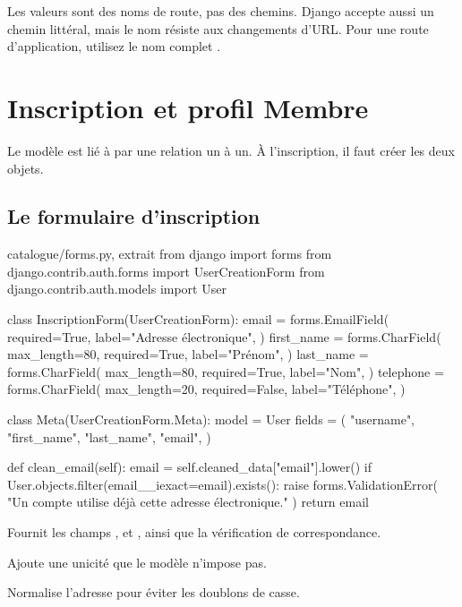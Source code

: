 \begin{note}
Les valeurs sont des noms de route, pas des chemins. Django accepte aussi un chemin
littéral, mais le nom résiste aux changements d'URL. Pour une route d'application,
utilisez le nom complet .
\end{note}

\section{Inscription et profil Membre}

Le modèle  est lié à  par une relation un à un. À
l'inscription, il faut créer les deux objets.

\subsection{Le formulaire d'inscription}

\begin{codebox}[python]{catalogue/forms.py, extrait}
from django import forms
from django.contrib.auth.forms import UserCreationForm
from django.contrib.auth.models import User


class InscriptionForm(UserCreationForm):
    email = forms.EmailField(
        required=True,
        label="Adresse électronique",
    )
    first_name = forms.CharField(
        max_length=80,
        required=True,
        label="Prénom",
    )
    last_name = forms.CharField(
        max_length=80,
        required=True,
        label="Nom",
    )
    telephone = forms.CharField(
        max_length=20,
        required=False,
        label="Téléphone",
    )

    class Meta(UserCreationForm.Meta):
        model = User
        fields = (
            "username",
            "first_name",
            "last_name",
            "email",
        )

    def clean_email(self):
        email = self.cleaned_data["email"].lower()
        if User.objects.filter(email__iexact=email).exists():
            raise forms.ValidationError(
                "Un compte utilise déjà cette adresse électronique."
            )
        return email
\end{codebox}

\begin{description}[leftmargin=5.1cm,style=nextline]
  \item[\code{UserCreationForm}] Fournit les champs ,
   et , ainsi que la vérification de
  correspondance.
  \item[\code{clean\_email()}] Ajoute une unicité que le modèle 
  n'impose pas.
  \item[\code{lower()}] Normalise l'adresse pour éviter les doublons de casse.
\end{description}

